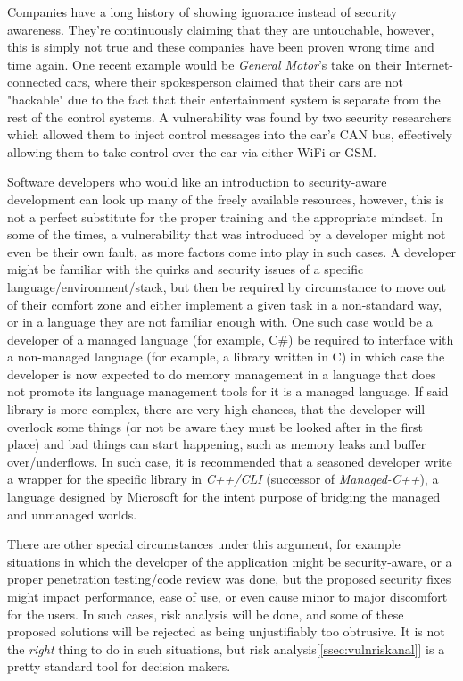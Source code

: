 \documentclass[a4paper,12pt]{article}
\begin{document}
	Companies have a long history of showing ignorance instead of security awareness. They're continuously claiming that they are untouchable, however, this is simply not true and these companies have been proven wrong time and time again. One recent example would be \textit{General Motor}'s take on their Internet-connected cars, where their spokesperson claimed that their cars are not "hackable" due to the fact that their entertainment system is separate from the rest of the control systems. A vulnerability was found by two security researchers\cite{cmiller15} which allowed them to inject control messages into the car's CAN bus, effectively allowing them to take control over the car via either WiFi or GSM.
	
	Software developers who would like an introduction to security-aware development can look up many of the freely available resources, however, this is not a perfect substitute for the proper training and the appropriate mindset. In some of the times, a vulnerability that was introduced by a developer might not even be their own fault, as more factors come into play in such cases. A developer might be familiar with the quirks and security issues of a specific language/environment/stack, but then be required by circumstance to move out of their comfort zone and either implement a given task in a non-standard way, or in a language they are not familiar enough with. One such case would be a developer of a managed language (for example, C\#) be required to interface with a non-managed language (for example, a library written in C) in which case the developer is now expected to do memory management in a language that does not promote its language management tools for it is a managed language. If said library is more complex, there are very high chances, that the developer will overlook some things (or not be aware they must be looked after in the first place) and bad things can start happening, such as memory leaks and buffer over/underflows. In such case, it is recommended that a seasoned developer write a wrapper for the specific library in \textit{C++/CLI} (successor of \textit{Managed-C++}), a language designed by Microsoft for the intent purpose\cite{hstutter06} of bridging the managed and unmanaged worlds.
	
	There are other special circumstances under this argument, for example situations in which the developer of the application might be security-aware, or a proper penetration testing/code review was done, but the proposed security fixes might impact performance, ease of use, or even cause minor to major discomfort for the users. In such cases, risk analysis will be done, and some of these proposed solutions will be rejected as being unjustifiably too obtrusive. It is not the \textit{right} thing to do in such situations, but risk analysis[\ref{ssec:vulnriskanal}] is a pretty standard tool for decision makers.
	
\end{document}
